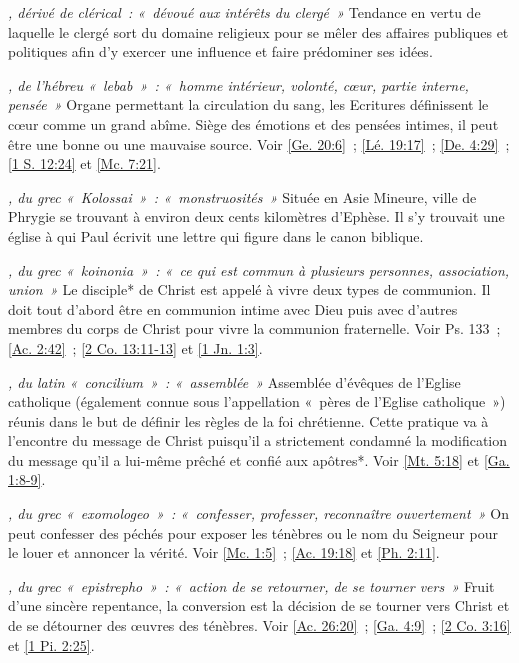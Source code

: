 \begin{multicols}{2}
\textit{, dérivé de clérical~: «~dévoué aux intérêts du clergé~»}\newline
Tendance en vertu de laquelle le clergé sort du domaine religieux pour se mêler des affaires publiques et politiques afin d'y exercer une influence et faire prédominer ses idées.

\textit{, de l'hébreu «~lebab~»~: «~homme intérieur, volonté, cœur, partie interne, pensée~»}\newline
Organe permettant la circulation du sang, les Ecritures définissent le cœur comme un grand abîme. Siège des émotions et des pensées intimes, il peut être une bonne ou une mauvaise source. Voir \vref{Ge. 20:6}~; \vref{Lé. 19:17}~; \vref{De. 4:29}~; \vref{1 S. 12:24} et \vref{Mc. 7:21}.

\textit{, du grec «~Kolossai~»~: «~monstruosités~»}\newline
Située en Asie Mineure, ville de Phrygie se trouvant à environ deux cents kilomètres d'Ephèse. Il s'y trouvait une église à qui Paul écrivit une lettre qui figure dans le canon biblique.

\textit{, du grec «~koinonia~»~: «~ce qui est commun à plusieurs personnes, association, union~»}\newline
Le disciple* de Christ est appelé à vivre deux types de communion. Il doit tout d'abord être en communion intime avec Dieu puis avec d'autres membres du corps de Christ pour vivre la communion fraternelle. Voir Ps. 133~; \vref{Ac. 2:42}~; \vref{2 Co. 13:11-13} et \vref{1 Jn. 1:3}.

\textit{, du latin «~concilium~»~: «~assemblée~»}\newline
Assemblée d'évêques de l'Eglise catholique (également connue sous l'appellation «~pères de l'Eglise catholique~») réunis dans le but de définir les règles de la foi chrétienne. Cette pratique va à l'encontre du message de Christ puisqu'il a strictement condamné la modification du message qu'il a lui-même prêché et confié aux apôtres*. Voir \vref{Mt. 5:18} et \vref{Ga. 1:8-9}.

\textit{, du grec «~exomologeo~»~: «~confesser, professer, reconnaître ouvertement~»}\newline
On peut confesser des péchés pour exposer les ténèbres ou le nom du Seigneur pour le louer et annoncer la vérité. Voir \vref{Mc. 1:5}~; \vref{Ac. 19:18} et \vref{Ph. 2:11}.

\textit{, du grec «~epistrepho~»~: «~action de se retourner, de se tourner vers~»}\newline
Fruit d'une sincère repentance, la conversion est la décision de se tourner vers Christ et de se détourner des œuvres des ténèbres. Voir \vref{Ac. 26:20}~; \vref{Ga. 4:9}~; \vref{2 Co. 3:16} et \vref{1 Pi. 2:25}.


\end{multicols}
